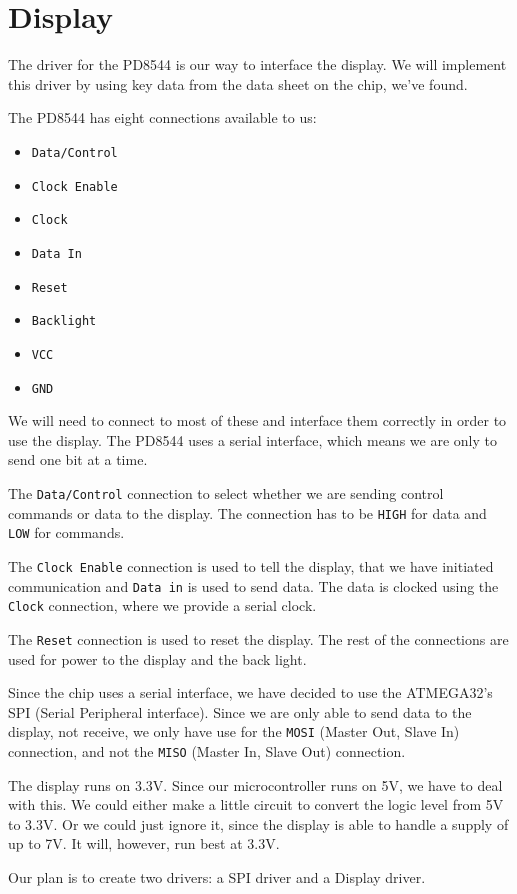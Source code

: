 \section{Display}

The driver for the PD8544 is our way to interface the display. We will implement this driver by using key data from the data sheet on the chip, we've found.

The PD8544 has eight connections available to us\cite{philips:pcd8544}:
\begin{itemize}
\item \texttt{Data/Control}
\item \texttt{Clock Enable}
\item \texttt{Clock}
\item \texttt{Data In}
\item \texttt{Reset}
\item \texttt{Backlight}
\item \texttt{VCC}
\item \texttt{GND}
\end{itemize}

We will need to connect to most of these and interface them correctly in order to use the display. The PD8544 uses a serial interface, which means we are only to send one bit at a time.

The \texttt{Data/Control} connection to select whether we are sending control commands or data to the display. The connection has to be \texttt{HIGH} for data and \texttt{LOW} for commands\cite{philips:pcd8544}.

The \texttt{Clock Enable} connection is used to tell the display, that we have initiated communication and \texttt{Data in} is used to send data. The data is clocked using the \texttt{Clock} connection, where we provide a serial clock.

The \texttt{Reset} connection is used to reset the display. The rest of the connections are used for power to the display and the back light.

Since the chip uses a serial interface, we have decided to use the ATMEGA32's SPI (Serial Peripheral interface). 
Since we are only able to send data to the display, not receive, we only have use for the \texttt{MOSI} (Master Out, Slave In) connection, and not the \texttt{MISO} (Master In, Slave Out) connection.

The display runs on 3.3V. Since our microcontroller runs on 5V, we have to deal with this. 
We could either make a little circuit to convert the logic level from 5V to 3.3V. Or we could just ignore it, since the display is able to handle a supply of up to 7V. It will, however, run best at 3.3V.

Our plan is to create two drivers: a SPI driver and a Display driver.


